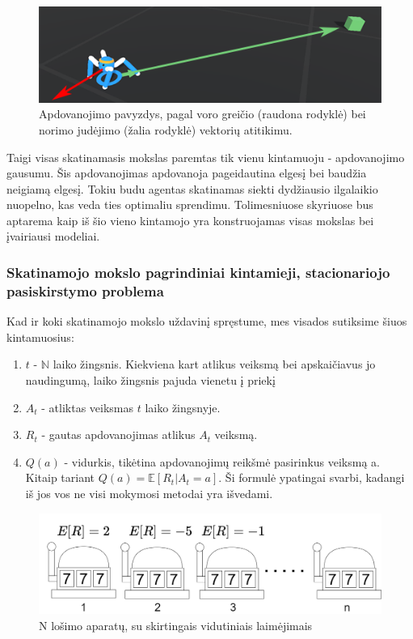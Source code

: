 \documentclass[a4paper, 12pt]{article}
\begin{document}
\begin{figure}[h]
\centering
\includegraphics[width=1\textwidth]{voroGreicioVektoriai}
\caption{Apdovanojimo pavyzdys, pagal voro greičio (raudona rodyklė) bei norimo judėjimo (žalia rodyklė) vektorių atitikimu.}
\label{voroGreicioVektoriai}
\end{figure}

Taigi visas skatinamasis mokslas paremtas tik vienu kintamuoju - apdovanojimo gausumu. Šis apdovanojimas apdovanoja pageidautina elgesį bei baudžia neigiamą elgesį. Tokiu budu agentas skatinamas siekti dydžiausio ilgalaikio nuopelno, kas veda ties optimaliu sprendimu. Tolimesniuose skyriuose bus aptarema kaip iš šio vieno kintamojo yra konstruojamas visas mokslas bei įvairiausi modeliai.

%
\subsubsection{Skatinamojo mokslo pagrindiniai kintamieji, stacionariojo pasiskirstymo problema}
%

Kad ir koki skatinamojo mokslo uždavinį spręstume, mes visados sutiksime šiuos kintamuosius:

\begin{enumerate}
  \addtolength{\itemsep}{-0.5\baselineskip} 
  \item $t$ - $\mathbb{N}$ laiko žingsnis. Kiekviena kart atlikus veiksmą bei apskaičiavus jo naudingumą, laiko žingsnis pajuda vienetu į priekį
  \item $A_t$ - atliktas veiksmas $t$ laiko žingsnyje.
  \item $R_t$ - gautas apdovanojimas atlikus $A_t$ veiksmą.
  \item $Q(a)$ - vidurkis, tikėtina apdovanojimų reikšmė pasirinkus veiksmą a. Kitaip tariant $Q(a) = \mathbb{E}[R_t | A_t = a] $. Ši formulė ypatingai svarbi, kadangi iš jos vos ne visi mokymosi metodai yra išvedami.
\end{enumerate}

\begin{figure}[h]
\centering
\includegraphics[width=1\textwidth]{losimoaparatai}
\caption{N lošimo aparatų, su skirtingais vidutiniais laimėjimais}
\label{losimoaparatai}
\end{figure}
\end{document}

